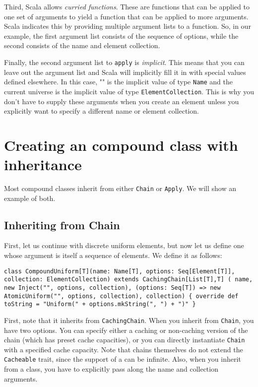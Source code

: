 Third, Scala allows \emph{curried functions}. These are functions that can be applied to one set of arguments to yield a function that can be applied to more arguments. Scala indicates this by providing multiple argument lists to a function. So, in our example, the first argument list consists of the sequence of options, while the second consists of the name and element collection.

Finally, the second argument list to \texttt{apply} is \emph{implicit}. This means that you can leave out the argument list and Scala will implicitly fill it in with special values defined elsewhere. In this case, "" is the implicit value of type \texttt{Name} and the current universe is the implicit value of type \texttt{ElementCollection}. This is why you don't have to supply these arguments when you create an element unless you explicitly want to specify a different name or element collection.

\section{Creating an compound class with inheritance}

Most compound classes inherit from either \texttt{Chain} or \texttt{Apply}. We will show an example of both.

\subsection{Inheriting from Chain}

First, let us continue with discrete uniform elements, but now let us define one whose argument is itself a sequence of elements. We define it as follows:

\begin{flushleft}
\texttt{class CompoundUniform[T](name: Name[T], options: Seq[Element[T]], 
\newline collection: ElementCollection) extends CachingChain[List[T],T] (
name,
\newline \tab new Inject("", options, collection),
\newline \tab (options: Seq[T]) => new AtomicUniform("", options, collection),
collection) \{
\newline \tab override def toString = "Uniform(" + options.mkString(", ") + ")"
\newline \}
}
\end{flushleft}

First, note that it inherits from \texttt{CachingChain}. When you inherit from \texttt{Chain}, you have two options. You can specify either a caching or non-caching version of the chain (which has preset cache capacities), or you can directly instantiate \texttt{Chain} with a specified cache capacity. Note that chains themselves do not extend the \texttt{Cacheable} trait, since the support of a can be infinite. Also, when you inherit from a class, you have to explicitly pass along the name and collection arguments.

